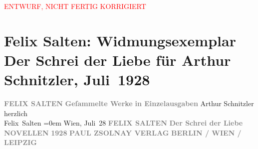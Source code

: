 
\begin{center}
            \textcolor{red}{ENTWURF, NICHT FERTIG KORRIGIERT}
                      \end{center}
            
         \renewcommand{\erwaehnteInstitutionen}{Institutionen: Paul Zsolnay Verlag}
         \renewcommand{\erwaehnteOrte}{Orte: Berlin, Leipzig, Wien}
         \renewcommand{\erwaehnteWerke}{Werke: Der Schrei der Liebe. Novellen}
               \section[Felix Salten: Widmungsexemplar Der Schrei der Liebe für Arthur Schnitzler, Juli 1928]{ Felix Salten: Widmungsexemplar Der Schrei der Liebe für Arthur
               Schnitzler, Juli 1928}\nopagebreak{}\rehead{ }\begin{ledgroupsized}[t]{13cm}\normalsize\beginnumbering \toendnotes[C]{\smallbreak\pagebreak[2]} 
\pstart
           \noindent{}\centering{}{\pb}\textcolor{gray}{\textbf{FELIX SALTEN}}\pend
           \pstart
           \noindent{}\centering{}\textcolor{gray}{\textbf{Geſammelte Werke}}\pend
           \pstart
           \noindent{}\centering{}\textcolor{gray}{\textbf{in Einzelausgaben}}\pend
           \pstart
           \noindent{}Arthur Schnitzler\pend
           \pstart
           herzlich{\\[\baselineskip]}\spacefill\mbox{Felix Salten}\pend
           \leftskip=0em{}\pstart
           Wien, Juli 28\pend
           {\bigskip}\pstart
           \noindent{}\centering{}{\pb}\textcolor{gray}{\textbf{FELIX SALTEN}}\pend
           \pstart
           \noindent{}\centering{}\textcolor{gray}{\textbf{Der Schrei der Liebe}}\pend
           \pstart
           \noindent{}\centering{}\textcolor{gray}{\textbf{NOVELLEN}}\pend
           {\bigskip}\pstart
           \noindent{}\centering{}\textcolor{gray}{\textbf{1928}}\pend
           \pstart
           \noindent{}\centering{}\textcolor{gray}{\textbf{PAUL ZSOLNAY VERLAG}}\pend
           \pstart
           \noindent{}\centering{}\textcolor{gray}{\textbf{BERLIN / WIEN / LEIPZIG}}\pend
           
         
         \endnumbering{}\end{ledgroupsized}\begin{anhang}\end{anhang}\newcommand{\dateiname}{L03044}\newcommand{\titel}{Felix Salten: Widmungsexemplar Der Schrei der Liebe für Arthur Schnitzler, Juli 1928}\newcommand{\editorInnen}{Martin Anton Müller und Laura Untner}
      